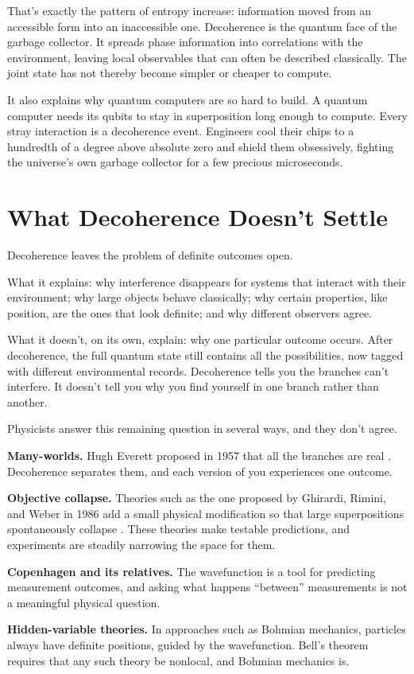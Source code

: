 That's exactly the pattern of entropy increase: information moved from an accessible form into an inaccessible one. Decoherence is the quantum face of the garbage collector. It spreads phase information into correlations with the environment, leaving local observables that can often be described classically. The joint state has not thereby become simpler or cheaper to compute.

It also explains why quantum computers are so hard to build. A quantum computer needs its qubits to stay in superposition long enough to compute. Every stray interaction is a decoherence event. Engineers cool their chips to a hundredth of a degree above absolute zero and shield them obsessively, fighting the universe's own garbage collector for a few precious microseconds.

\section{What Decoherence Doesn't Settle}

Decoherence leaves the problem of definite outcomes open.

What it explains: why interference disappears for systems that interact with their environment; why large objects behave classically; why certain properties, like position, are the ones that look definite; and why different observers agree.

What it doesn't, on its own, explain: why one particular outcome occurs. After decoherence, the full quantum state still contains all the possibilities, now tagged with different environmental records. Decoherence tells you the branches can't interfere. It doesn't tell you why you find yourself in one branch rather than another.

Physicists answer this remaining question in several ways, and they don't agree.

\begin{compactchecklist}
\item \textbf{Many-worlds.} Hugh Everett proposed in 1957 that all the branches are real \cite{everett1957}. Decoherence separates them, and each version of you experiences one outcome.
\item \textbf{Objective collapse.} Theories such as the one proposed by Ghirardi, Rimini, and Weber in 1986 add a small physical modification so that large superpositions spontaneously collapse \cite{grw1986}. These theories make testable predictions, and experiments are steadily narrowing the space for them.
\item \textbf{Copenhagen and its relatives.} The wavefunction is a tool for predicting measurement outcomes, and asking what happens ``between'' measurements is not a meaningful physical question.
\item \textbf{Hidden-variable theories.} In approaches such as Bohmian mechanics, particles always have definite positions, guided by the wavefunction. Bell's theorem requires that any such theory be nonlocal, and Bohmian mechanics is.
\end{compactchecklist}

